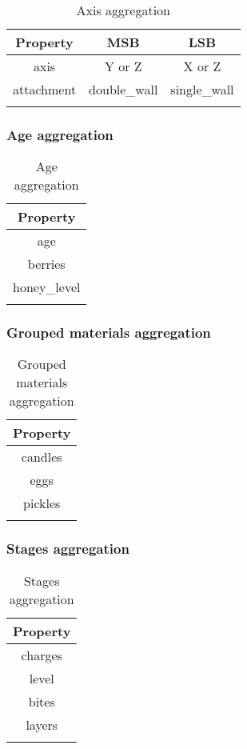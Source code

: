 \begin{longtable}{ |c|c|c| }
\hline
Property & MSB & LSB \\
\hline
\endhead
axis & Y or Z & X or Z \\
\hline
attachment & double\_wall & single\_wall \\
\hline
\caption{Axis aggregation}
\end{longtable}

\subsubsection{Age aggregation}\label{spigot-types:age}

\begin{longtable}{ |c| }
\hline
Property \\
\hline
\endhead
age \\
berries \\
honey\_level \\
\hline
\caption{Age aggregation}
\end{longtable}

\subsubsection{Grouped materials aggregation}\label{spigot-types:groups}

\begin{longtable}{ |c| }
\hline
Property \\
\hline
\endhead
candles \\
eggs \\
pickles \\
\hline
\caption{Grouped materials aggregation}
\end{longtable}

\subsubsection{Stages aggregation}\label{spigot-types:stages}

\begin{longtable}{ |c| }
\hline
Property \\
\hline
\endhead
charges \\
level \\
bites \\
layers \\
\hline
\caption{Stages aggregation}
\end{longtable}

